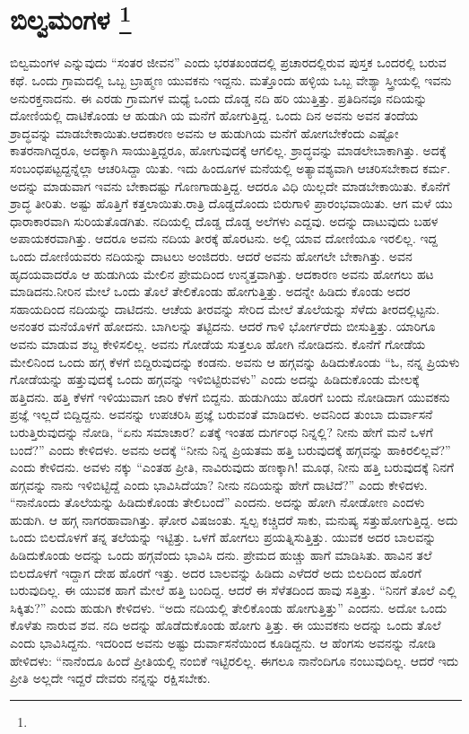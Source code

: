 
\chapter[ಬಿಲ್ವಮಂಗಳ ]{ಬಿಲ್ವಮಂಗಳ \protect\footnote{}}

ಬಿಲ್ವಮಂಗಳ ಎನ್ನುವುದು “ಸಂತರ ಜೀವನ” ಎಂದು ಭರತಖಂಡದಲ್ಲಿ ಪ್ರಚಾರದಲ್ಲಿರುವ ಪುಸ್ತಕ ಒಂದರಲ್ಲಿ ಬರುವ ಕಥೆ. ಒಂದು ಗ್ರಾಮದಲ್ಲಿ ಒಬ್ಬ ಬ್ರಾಹ್ಮಣ ಯುವಕನು ಇದ್ದನು. ಮತ್ತೊಂದು ಹಳ್ಳಿಯ ಒಬ್ಬ ವೇಶ್ಯಾ ಸ್ತ್ರೀಯಲ್ಲಿ ಇವನು ಅನುರಕ್ತನಾದನು. ಈ ಎರಡು ಗ್ರಾಮಗಳ ಮಧ್ಯೆ ಒಂದು ದೊಡ್ಡ ನದಿ ಹರಿ ಯುತ್ತಿತ್ತು. ಪ್ರತಿದಿನವೂ ನದಿಯನ್ನು ದೋಣಿಯಲ್ಲಿ ದಾಟಿಕೊಂಡು ಆ ಹುಡುಗಿ ಯ ಮನೆಗೆ ಹೋಗುತ್ತಿದ್ದ. ಒಂದು ದಿನ ಅವನು ಅವನ ತಂದೆಯ ಶ್ರಾದ್ಧವನ್ನು ಮಾಡಬೇಕಾಯಿತು.ಆದಕಾರಣ ಅವನು ಆ ಹುಡುಗಿಯ ಮನೆಗೆ ಹೋಗಬೇಕೆಂದು ಎಷ್ಟೋ ಕಾತರನಾಗಿದ್ದರೂ, ಅದಕ್ಕಾಗಿ ಸಾಯುತ್ತಿದ್ದರೂ, ಹೋಗುವುದಕ್ಕೆ ಆಗಲಿಲ್ಲ. ಶ್ರಾದ್ಧವನ್ನು ಮಾಡಲೇಬಾಕಾಗಿತ್ತು. ಅದಕ್ಕೆ ಸಂಬಂಧಪಟ್ಟದ್ದನ್ನೆಲ್ಲಾ ಆಚರಿಸಿದ್ದಾ ಯಿತು. ಇದು ಹಿಂದೂಗಳ ಮನೆಯಲ್ಲಿ ಅತ್ಯಾವಶ್ಯವಾಗಿ ಆಚರಿಸಬೇಕಾದ ಕರ್ಮ. ಅದನ್ನು ಮಾಡುವಾಗ ಇವನು ಬೇಕಾದಷ್ಟು ಗೊಣಗಾಡುತ್ತಿದ್ದ. ಆದರೂ ವಿಧಿ ಯಿಲ್ಲದೇ ಮಾಡಬೇಕಾಯಿತು. ಕೊನೆಗೆ ಶ್ರಾದ್ಧ ತೀರಿತು. ಅಷ್ಟು ಹೊತ್ತಿಗೆ ಕತ್ತಲಾಯಿತು.ರಾತ್ರಿ ದೊಡ್ಡದೊಂದು ಬಿರುಗಾಳಿ ಪ್ರಾರಂಭವಾಯಿತು. ಆಗ ಮಳೆ ಯು ಧಾರಾಕಾರವಾಗಿ ಸುರಿಯತೊಡಗಿತು. ನದಿಯಲ್ಲಿ ದೊಡ್ಡ ದೊಡ್ಡ ಅಲೆಗಳು ಎದ್ದವು. ಅದನ್ನು ದಾಟುವುದು ಬಹಳ ಅಪಾಯಕರವಾಗಿತ್ತು. ಆದರೂ ಅವನು ನದಿಯ ತೀರಕ್ಕೆ ಹೊರಟನು. ಅಲ್ಲಿ ಯಾವ ದೋಣಿಯೂ ಇರಲಿಲ್ಲ. ಇದ್ದ ಒಂದು ದೋಣಿಯವರು ನದಿಯನ್ನು ದಾಟಲು ಅಂಜಿದರು. ಆದರೆ ಅವನು ಹೋಗಲೇ ಬೇಕಾಗಿತ್ತು. ಅವನ ಹೃದಯವಾದರೊ ಆ ಹುಡುಗಿಯ ಮೇಲಿನ ಪ್ರೇಮದಿಂದ ಉನ್ಮತ್ತವಾಗಿತ್ತು. ಆದಕಾರಣ ಅವನು ಹೋಗಲು ಹಟ ಮಾಡಿದನು.ನೀರಿನ ಮೇಲೆ ಒಂದು ತೊಲೆ ತೇಲಿಕೊಂಡು ಹೋಗುತ್ತಿತ್ತು. ಅದನ್ನೇ ಹಿಡಿದು ಕೊಂಡು ಅದರ ಸಹಾಯದಿಂದ ನದಿಯನ್ನು ದಾಟಿದನು. ಆಚೆಯ ತೀರವನ್ನು ಸೇರಿದ ಮೇಲೆ ತೊಲೆಯನ್ನು ಸೆಳೆದು ತೀರದಲ್ಲಿಟ್ಟನು. ಅನಂತರ ಮನೆಯೊಳಗೆ ಹೋದನು. ಬಾಗಿಲನ್ನು ತಟ್ಟಿದನು. ಆದರೆ ಗಾಳಿ ಭೋರ್ಗರೆದು ಬೀಸುತ್ತಿತ್ತು. ಯಾರಿಗೂ ಅವನು ಮಾಡುವ ಶಬ್ದ ಕೇಳಿಸಲಿಲ್ಲ. ಅವನು ಗೋಡೆಯ ಸುತ್ತಲೂ ಹೋಗಿ ನೋಡಿದನು. ಕೊನೆಗೆ ಗೋಡೆಯ ಮೇಲಿನಿಂದ ಒಂದು ಹಗ್ಗ ಕೆಳಗೆ ಬಿದ್ದಿರುವುದನ್ನು ಕಂಡನು. ಅವನು ಆ ಹಗ್ಗವನ್ನು ಹಿಡಿದುಕೊಂಡು “ಓ, ನನ್ನ ಪ್ರಿಯಳು ಗೋಡೆಯನ್ನು ಹತ್ತುವುದಕ್ಕೆ ಒಂದು ಹಗ್ಗವನ್ನು ಇಳಿಬಿಟ್ಟಿರುವಳು” ಎಂದು ಅದನ್ನು ಹಿಡಿದುಕೊಂಡು ಮೇಲಕ್ಕೆ ಹತ್ತಿದನು. ಹತ್ತಿ ಕೆಳಗೆ ಇಳಿಯುವಾಗ ಜಾರಿ ಕೆಳಗೆ ಬಿದ್ದನು. ಹುಡುಗಿಯು ಹೊರಗೆ ಬಂದು ನೋಡಿದಾಗ ಯುವಕನು ಪ್ರಜ್ಞೆ ಇಲ್ಲದೆ ಬಿದ್ದಿದ್ದನು. ಅವನನ್ನು ಉಪಚರಿಸಿ ಪ್ರಜ್ಞೆ ಬರುವಂತೆ ಮಾಡಿದಳು. ಅವನಿಂದ ತುಂಬಾ ದುರ್ವಾಸನೆ ಬರುತ್ತಿರುವುದನ್ನು ನೋಡಿ, “ಏನು ಸಮಾಚಾರ? ಏತಕ್ಕೆ ಇಂತಹ ದುರ್ಗಂಧ ನಿನ್ನಲ್ಲಿ? ನೀನು ಹೇಗೆ ಮನೆ ಒಳಗೆ ಬಂದೆ?” ಎಂದು ಕೇಳಿದಳು. ಅವನು ಅದಕ್ಕೆ “ನೀನು ನಿನ್ನ ಪ್ರಿಯತಮ ಹತ್ತಿ ಬರುವುದಕ್ಕೆ ಹಗ್ಗವನ್ನು ಹಾಕಿರಲಿಲ್ಲವೆ?” ಎಂದು ಕೇಳಿದನು. ಅವಳು ನಕ್ಕು “ಎಂತಹ ಪ್ರೀತಿ, ನಾವಿರುವುದು ಹಣಕ್ಕಾಗಿ! ಮೂಢ, ನೀನು ಹತ್ತಿ ಬರುವುದಕ್ಕೆ ನಿನಗೆ ಹಗ್ಗವನ್ನು ನಾನು ಇಳಿಬಿಟ್ಟಿದ್ದೆ ಎಂದು ಭಾವಿಸಿದೆಯಾ? ನೀನು ನದಿಯನ್ನು ಹೇಗೆ ದಾಟಿದೆ?” ಎಂದು ಕೇಳಿದಳು. “ನಾನೊಂದು ತೊಲೆಯನ್ನು ಹಿಡಿದುಕೊಂಡು ತೇಲಿಬಂದೆ” ಎಂದನು. ಅದನ್ನು ಹೋಗಿ ನೋಡೋಣ ಎಂದಳು ಹುಡುಗಿ. ಆ ಹಗ್ಗ ನಾಗರಹಾವಾಗಿತ್ತು. ಘೋರ ವಿಷಜಂತು. ಸ್ವಲ್ಪ ಕಚ್ಚಿದರೆ ಸಾಕು, ಮನುಷ್ಯ ಸತ್ತುಹೋಗುತ್ತಿದ್ದ. ಅದು ಒಂದು ಬಿಲದೊಳಗೆ ತನ್ನ ತಲೆಯನ್ನು ಇಟ್ಟಿತ್ತು. ಒಳಗೆ ಹೋಗಲು ಪ್ರಯತ್ನಿಸುತ್ತಿತ್ತು. ಯುವಕ ಅದರ ಬಾಲವನ್ನು ಹಿಡಿದುಕೊಂಡು ಅದನ್ನು ಒಂದು ಹಗ್ಗವೆಂದು ಭಾವಿಸಿ ದನು. ಪ್ರೇಮದ ಹುಚ್ಚು ಹಾಗೆ ಮಾಡಿಸಿತು. ಹಾವಿನ ತಲೆ ಬಿಲದೊಳಗೆ ಇದ್ದಾಗ ದೇಹ ಹೊರಗೆ ಇತ್ತು. ಅದರ ಬಾಲವನ್ನು ಹಿಡಿದು ಎಳೆದರೆ ಅದು ಬಿಲದಿಂದ ಹೊರಗೆ ಬರುವುದಿಲ್ಲ. ಈ ಯುವಕ ಹಾಗೆ ಮೇಲೆ ಹತ್ತಿ ಬಂದಿದ್ದ. ಆದರೆ ಈ ಸೆಳೆತದಿಂದ ಹಾವು ಸತ್ತಿತ್ತು. “ನಿನಗೆ ತೊಲೆ ಎಲ್ಲಿ ಸಿಕ್ಕಿತು?” ಎಂದು ಹುಡುಗಿ ಕೇಳಿದಳು. “ಅದು ನದಿಯಲ್ಲಿ ತೇಲಿಕೊಂಡು ಹೋಗುತ್ತಿತ್ತು” ಎಂದನು. ಅದೋ ಒಂದು ಕೊಳೆತು ನಾರುವ ಶವ. ನದಿ ಅದನ್ನು ಹೊಡೆದುಕೊಂಡು ಹೋಗು ತ್ತಿತ್ತು. ಈ ಯುವಕನು ಅದನ್ನು ಒಂದು ತೊಲೆ ಎಂದು ಭಾವಿಸಿದ್ದನು. ಇದರಿಂದ ಅವನು ಅಷ್ಟು ದುರ್ವಾಸನೆಯಿಂದ ಕೂಡಿದ್ದನು. ಆ ಹೆಂಗಸು ಅವನನ್ನು ನೋಡಿ ಹೇಳಿದಳು: “ನಾನೆಂದೂ ಹಿಂದೆ ಪ್ರೀತಿಯಲ್ಲಿ ನಂಬಿಕೆ ಇಟ್ಟಿರಲಿಲ್ಲ. ಈಗಲೂ ನಾನೆಂದಿಗೂ ನಂಬುವುದಿಲ್ಲ. ಆದರೆ ಇದು ಪ್ರೀತಿ ಅಲ್ಲದೇ ಇದ್ದರೆ ದೇವರು ನನ್ನನ್ನು ರಕ್ಷಿಸಬೇಕು. 